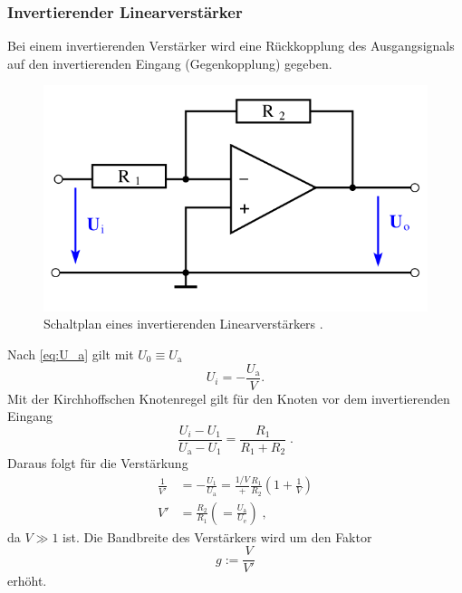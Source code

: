 \subsubsection{Invertierender Linearverstärker}
Bei einem invertierenden Verstärker wird eine Rückkopplung des Ausgangsignals auf den invertierenden Eingang (Gegenkopplung) gegeben.
\begin{figure}
    \centering
    \includegraphics[width = .5\textwidth]{"content/pics/inverting.png"}
    \caption{Schaltplan eines invertierenden Linearverstärkers \cite{v51}.}
    \label{fig:inverting}
\end{figure}
Nach \autoref{eq:U_a} gilt mit $U_0 \equiv U_\text{a}$ 
\begin{equation*}
U_i = -\frac{U_\text{a}}{V}.
\end{equation*}
Mit der Kirchhoffschen Knotenregel gilt für den Knoten vor dem invertierenden Eingang 
\begin{equation*}
    \frac{U_i - U_1}{U_\text{a} - U_1} = \frac{R_1}{R_1 + R_2}\;.
\end{equation*}
Daraus folgt für die Verstärkung 
\begin{align}
    \frac{1}{V'} &= -\frac{U_1}{U_\text{a}} = \frac{1/V} + \frac{R_1}{R_2}\left(1 + \frac{1}{V}\right) \nonumber \\
    V' &= \frac{R_2}{R_1} \left( = \frac{U_\text{a}}{U_\text{e}}\right) \;,
    \label{eq:invert}
\end{align}
da $V \gg 1$ ist.
Die Bandbreite des Verstärkers wird um den Faktor 
\begin{equation}
    g := \frac{V}{V'}
\end{equation}
erhöht.

